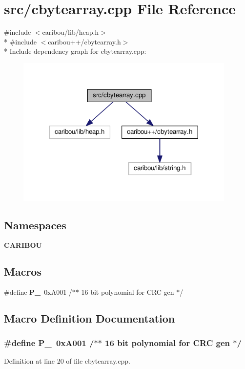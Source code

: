 \section{src/cbytearray.cpp File Reference}
\label{cbytearray_8cpp}
{\ttfamily \#include $<$caribou/lib/heap.\+h$>$}\\*
{\ttfamily \#include $<$caribou++/cbytearray.\+h$>$}\\*
Include dependency graph for cbytearray.\+cpp\+:
\nopagebreak
\begin{figure}[H]
\begin{center}
\leavevmode
\includegraphics[width=308pt]{cbytearray_8cpp__incl}
\end{center}
\end{figure}
\subsection*{Namespaces}
\begin{DoxyCompactItemize}
\item 
 {\bf C\+A\+R\+I\+B\+OU}
\end{DoxyCompactItemize}
\subsection*{Macros}
\begin{DoxyCompactItemize}
\item 
\#define {\bf P\+\_}~0x\+A001			/$\ast$$\ast$ 16 bit polynomial for C\+R\+C gen $\ast$/
\end{DoxyCompactItemize}


\subsection{Macro Definition Documentation}
\subsubsection[{P\+\_\+16}]{\setlength{\rightskip}{0pt plus 5cm}\#define P\+\_~0x\+A001			/$\ast$$\ast$ 16 bit polynomial for C\+R\+C gen $\ast$/}\label{cbytearray_8cpp_a5f2c80f23918438660a73b49507b3195}


Definition at line 20 of file cbytearray.\+cpp.

